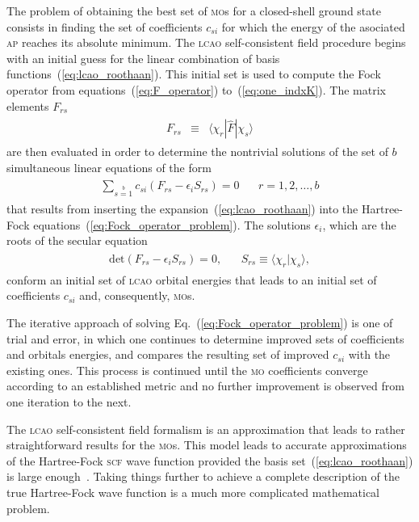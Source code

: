 The problem of obtaining the best set of \textsc{mo}s for a
closed-shell ground state consists in finding the set of coefficients
$c_{si}$ for which the energy of the asociated \textsc{ap} reaches its
absolute minimum. The \textsc{lcao} self-consistent field procedure
begins with an initial guess for the linear combination of basis
functions~(\ref{eq:lcao_roothaan}). This initial set is used to
compute the Fock operator from equations~(\ref{eq:F_operator})
to~(\ref{eq:one_indxK}). The matrix elements $F_{rs}$
%
\begin{eqnarray}
  \begin{split}
    F_{rs} & \equiv & \langle \chi_{r} | \hat{F} | \chi_{s} \rangle
  \end{split}
  \label{eq:F_matrix}
\end{eqnarray}
%
are then evaluated in order to determine the nontrivial solutions of
the set of $b$ simultaneous linear equations of the form
%
\begin{eqnarray}
  \begin{split}
    \sum\limits_{s=1}\limits^{b} c_{si} (F_{rs} - \epsilon_{i}S_{rs}) = 0 &
    ~~~~ r = 1,2,\dots,b
  \end{split}
  \label{eq:set_linear_eqs}
\end{eqnarray}
%
that results from inserting the expansion~(\ref{eq:lcao_roothaan})
into the Hartree-Fock equations~(\ref{eq:Fock_operator_problem}). The
solutions $\epsilon_{i}$, which are the roots of the secular
equation~\cite{Roothaan_HF,Levine_QChem}
%
\begin{eqnarray}
  \begin{split}
    \mathrm{det} (F_{rs} - \epsilon_{i}S_{rs}) = 0, &
    ~~~~ S_{rs} \equiv \langle \chi_{r} | \chi_{s} \rangle,
  \end{split}
  \label{eq:secular_eigenvalues}
\end{eqnarray}
%
conform an initial set of \textsc{lcao} orbital energies that leads to
an initial set of coefficients $c_{si}$ and, consequently,
\textsc{mo}s.

The iterative approach of solving Eq.~(\ref{eq:Fock_operator_problem})
is one of trial and error, in which one continues to determine
improved sets of coefficients and orbitals energies, and compares the
resulting set of improved $c_{si}$ with the existing ones. This
process is continued until the \textsc{mo} coefficients converge
according to an established metric and no further improvement is
observed from one iteration to the next.

The \textsc{lcao} self-consistent field formalism is an approximation
that leads to rather straightforward results for the
\textsc{mo}s. This model leads to accurate approximations of the
Hartree-Fock \textsc{scf} wave function provided the basis
set~(\ref{eq:lcao_roothaan}) is large
enough~\cite{EllisonShullh2o_1955, Moccia_JCP_2164, Moccia_JCP_2176,
  Moccia_1964}. Taking things further to achieve a complete
description of the true Hartree-Fock wave function is a much more
complicated mathematical problem.


